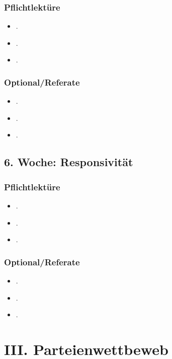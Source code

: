 \documentclass[abstract=on,parskip=full,headings=standardclasses,fontsize=11pt,paper=a4]{scrartcl}
\begin{document}
\subsubsection*{Pflichtlektüre}
\begin{itemize}
\item {}.
\item {}.
\item {}.
\end{itemize}


\subsubsection*{Optional/Referate}
\begin{itemize}
\item {}.
\item {}.
\item {}.
\end{itemize}


\subsection{6. Woche: Responsivität}

\subsubsection*{Pflichtlektüre}
\begin{itemize}
\item {}.
\item {}.
\item {}.
\end{itemize}

\subsubsection*{Optional/Referate}
\begin{itemize}
\item {}.
\item {}.
\item {}.
\end{itemize}



\section{III. Parteienwettbeweb}
\end{document}
